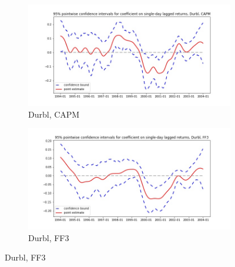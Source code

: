 \documentclass{article}
\begin{document}
    \begin{figure}
  \begin{subfigure}[b]{0.5\textwidth}
    \centering
    \includegraphics[width=\textwidth]{Durbl/pointwiseCIs_CAPM.jpg}
    \caption{Durbl, CAPM}
    \label{fig:1}
  \end{subfigure}
  \begin{subfigure}[b]{0.5\textwidth}
    \centering
    \includegraphics[width=\textwidth]{Durbl/pointwiseCIs_FF3.jpg}
    \caption{Durbl, FF3}
    \label{fig:2}
  \end{subfigure}
  \end{figure}
  
\end{document}
